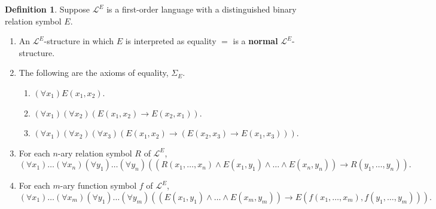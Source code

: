 \documentclass{article}
\newcommand{\rb}[1]{\left( #1 \right)}
\newcommand{\impb}[2]{\rb{#1 \rightarrow #2}}
\newcommand{\fab}[1]{\rb{\forall #1}}
\theoremstyle{definition}\newtheorem{definition}{Definition}[subsection]
\theoremstyle{definition}\newtheorem{remark}[definition]{Remark}
\theoremstyle{definition}\newtheorem*{example}{Example}
\theoremstyle{definition}\newtheorem*{note}{Note}
\begin{document}
\begin{definition}
Suppose $ \mathcal{L}^E $ is a first-order language with a distinguished binary relation symbol $ E $.
\begin{enumerate}
\item An $ \mathcal{L}^E $-structure in which $ E $ is interpreted as equality $ = $ is a \textbf{normal} $ \mathcal{L}^E $-structure.
\item The following are the axioms of equality, $ \Sigma_E $.
\begin{enumerate}
\item $ \fab{x_1}E\rb{x_1, x_2} $.
\item $ \fab{x_1}\fab{x_2}\impb{E\rb{x_1, x_2}}{E\rb{x_2, x_1}} $.
\item $ \fab{x_1}\fab{x_2}\fab{x_3}\impb{E\rb{x_1, x_2}}{\impb{E\rb{x_2, x_3}}{E\rb{x_1, x_3}}} $.
\end{enumerate}
\item For each $ n $-ary relation symbol $ R $ of $ \mathcal{L}^E $,
$$ \fab{x_1}\dots\fab{x_n}\fab{y_1}\dots\fab{y_n}\impb{\rb{R\rb{x_1, \dots, x_n} \land E\rb{x_1, y_1} \land \dots \land E\rb{x_n, y_n}}}{R\rb{y_1, \dots, y_n}}. $$
\item For each $ m $-ary function symbol $ f $ of $ \mathcal{L}^E $,
$$ \fab{x_1}\dots\fab{x_m}\fab{y_1}\dots\fab{y_m}\impb{\rb{E\rb{x_1, y_1} \land \dots \land E\rb{x_m, y_m}}}{E\rb{f\rb{x_1, \dots, x_m}, f\rb{y_1, \dots, y_m}}}. $$
\end{enumerate}
\end{definition}
\end{document}
